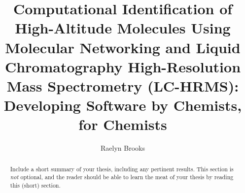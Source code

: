 \documentclass[palatino,code,picins,tikz,kaukecopyright,openright,lshortwooster,dropcaps,verbatim,index,oneside,euler,final]{woosterthesis}
\title{Computational Identification of High-Altitude Molecules Using Molecular Networking and Liquid Chromatography High-Resolution Mass Spectrometry (LC-HRMS): Developing Software by Chemists, for Chemists}
\author{Raelyn Brooks} %
\begin{document}
%
%

\frontmatter
{}

%                                                                                       
%                                                                                       

\begin{abstract}
Include a short summary of your thesis, including any pertinent results.  This section is \emph{not} optional, and the reader should be able to learn the meat of your thesis by reading this (short) section.
\end{abstract}

%                                                                                       
%                                                                                       

\dedication{This work is dedicated to the future generations of Wooster students.}


%                                                                                       
%                                                                                       
\end{document}
